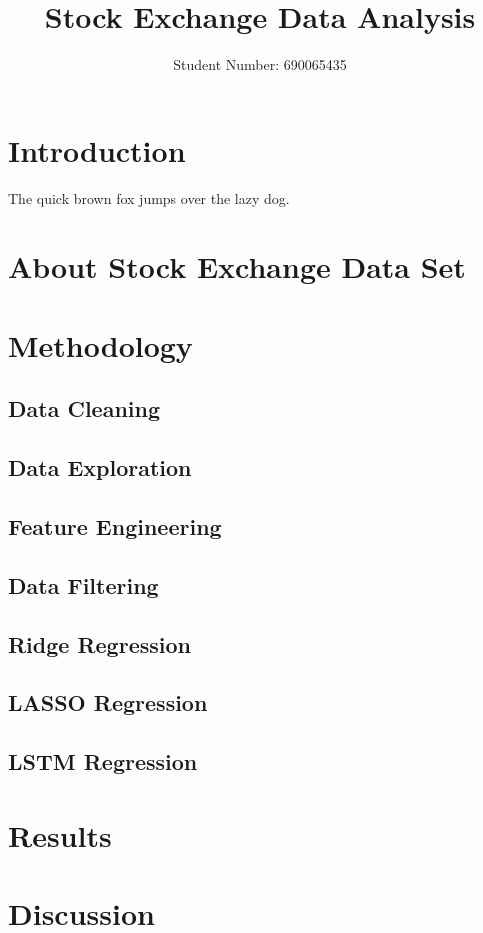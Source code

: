 \documentclass[a4paper, 11pt]{article}
\begin{document}
\title{Stock Exchange Data Analysis}
\author{Student Number: 690065435}
\maketitle

\section{Introduction}
The quick brown fox jumps over the lazy dog.

\section{About Stock Exchange Data Set}

\section{Methodology}

\subsection{Data Cleaning}

\subsection{Data Exploration}

\subsection{Feature Engineering}

\subsection{Data Filtering}

\subsection{Ridge Regression}

\subsection{LASSO Regression}

\subsection{LSTM Regression}

\section{Results}

\section{Discussion}
\end{document}
